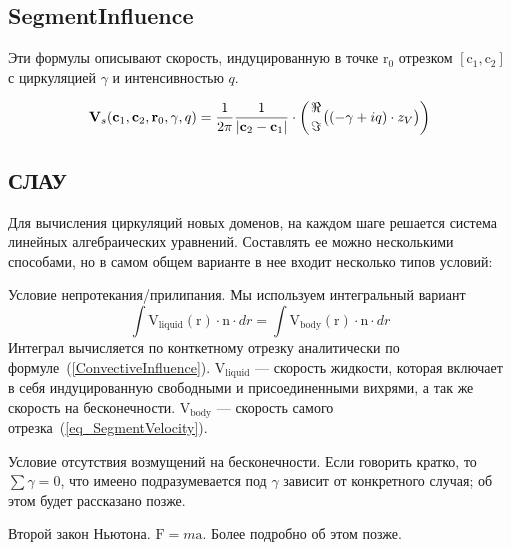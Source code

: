 \documentclass[14pt]{extreport}
\newcommand{\br}[1]{\boldsymbol{\mathrm{#1}}}
\renewcommand{\vec}[1]{\br{#1}}
\newenvironment{packed_enum}{
\begin{enumerate}
  \setlength{\itemsep}{1pt}
  \setlength{\parskip}{0pt}
  \setlength{\parsep}{0pt}
}{\end{enumerate}}
\begin{document}
\subsection{SegmentInfluence}
\label{SegmentInfluence}

Эти формулы описывают скорость, индуцированную в точке $\vec r_0$ отрезком $[\vec c_1, \vec c_2]$ с циркуляцией $\gamma$ и интенсивностью $q$.

\begin{equation}
\label{eq_SegmentInfluence}
\vec V_s (\vec c_1, \vec c_2, \vec r_0, \gamma, q) = \dfrac{1}{2\pi} \dfrac{1}{|\vec c_2 - \vec c_1|} \cdot \left( \genfrac{}{}{0pt}{}{\Re}{\Im} \bigl((-\gamma + iq) \cdot z_V \bigr) \right)
\end{equation}
 



\subsection{СЛАУ}

Для вычисления циркуляций новых доменов, на каждом шаге решается система линейных алгебраических уравнений. Составлять ее можно несколькими способами, но в самом общем варианте в нее входит несколько типов условий:

\begin{packed_enum}
\item Условие непротекания/прилипания. Мы используем интегральный вариант
\begin{equation*}
\int{\vec V_\text{liquid}(\vec r) \cdot \vec n \cdot dr} = \int {\vec V_\text{body}(\vec r) \cdot \vec n \cdot dr}
\end{equation*}
Интеграл вычисляется по конткетному отрезку аналитически по формуле~(\ref{ConvectiveInfluence}). $\br V_\text{liquid}$ --- скорость жидкости, которая включает в себя индуцированную свободными и присоединенными вихрями, а так же скорость на бесконечности. $\br V_\text{body}$ --- скорость самого отрезка~(\ref{eq_SegmentVelocity}).
\item Условие отсутствия возмущений на бесконечности. Если говорить кратко, то $\sum \gamma = 0$, что имеено подразумевается под $\gamma$ зависит от конкретного случая; об этом будет рассказано позже.
\item Второй закон Ньютона. $\br F = m \br a$. Более подробно об этом позже.
\end{packed_enum}
\end{document}
